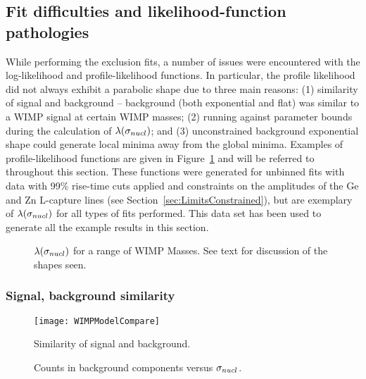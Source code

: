 	\subsection{Fit difficulties and likelihood-function pathologies}
	\label{sec:LLPathologies}
			
While performing the exclusion fits, a number of issues were encountered with the log-likelihood and profile-likelihood functions.  In particular, the profile likelihood did not always exhibit a parabolic shape due to three main reasons: (1) similarity of signal and background -- background (both exponential and flat) was similar to a WIMP signal at certain WIMP masses; (2) running against parameter bounds during the calculation of $\lambda(\sigma_{nucl})$; and (3) unconstrained background exponential shape could generate local minima away from the global minima.  Examples of profile-likelihood functions are given in Figure~\ref{fig:FitPathologies} and will be referred to throughout this section.  These functions were generated for unbinned fits with data with 99\% rise-time cuts applied and constraints on the amplitudes of the Ge and Zn L-capture lines (see Section~\ref{sec:LimitsConstrained}), but are exemplary of $\lambda(\sigma_{nucl})$ for all types of fits performed.  This data set has been used to generate all the example results in this section.
		
		\begin{figure}
			\centering
			\caption{$\lambda(\sigma_{nucl})$ for a range of WIMP Masses.  See text for discussion of the shapes
			seen.}
			\label{fig:FitPathologies}
		\end{figure}
		
		\subsubsection{Signal, background similarity}
		\label{sec:LLPathoSBSimilarity}
			
			\begin{figure}
				\centering
				\texttt{[image: WIMPModelCompare]}
				\caption{Similarity of signal and background.}
				\label{fig:SBSimilarity}
			\end{figure}			
			\begin{figure}
				\centering
				\caption{Counts in background components versus $\sigma_{nucl}$.}
				\label{fig:SBCountsInComponents}
			\end{figure}	
		

